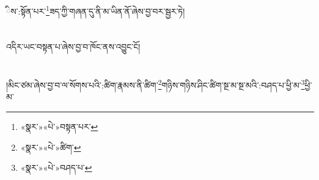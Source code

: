 ིས་:སྟོན་པར་\footnote{«སྣར་»«པེ་»བསྟན་པར་}ཟད་ཀྱི་གཞན་དུ་ནི་མ་ཡིན་ནོ་ཞེས་བྱ་བར་སྦྱར་ཏེ།\chapter{ }འདིར་ཡང་བསྟན་པ་ཞེས་བྱ་བ་ཁོང་ནས་འབྱུང་ངོ།\chapter{ }།མིང་ཙམ་ཞེས་བྱ་བ་ལ་སོགས་པའི་:ཚིག་རྣམས་ནི་ཚིག་\footnote{«སྣར་»«པེ་»ཚིག་}གཉིས་གཉིས་ཤིང་ཚིག་སྔ་མ་སྔ་མའི་:བཤད་པ་ཕྱི་མ་\footnote{«སྣར་»«པེ་»བཤད་པ་}ཕྱི་མ་